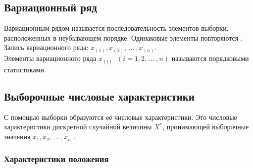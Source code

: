 \documentclass[a4paper,14pt]{article}
\begin{document}
	
	\subsection{Вариационный ряд}
	
	Вариационным рядом называется последовательность элементов выборки, расположенных в неубывающем порядке. Одинаковые элементы повторяются \cite[с. 409]{b:probSectMath}.\\
	Запись вариационного ряда: $x_{(1)}, x_{(2)}, \, ... \: , x_{(n)}$.\\
	Элементы вариационного ряда $x_{(i)} \;\; (i = 1, 2, \, ... \: , n)$ называются порядковыми статистиками.
	
	\subsection{Выборочные числовые характеристики}
	
	С помощью выборки образуются её числовые характеристики. Это числовые характеристики дискретной случайной величины $X^*$, принимающей выборочные значения $x_1, x_2, \, ... \: , x_n$ \cite[с. 411]{b:probSectMath}.
	
	\subsubsection{Характеристики положения}
	
\end{document}
